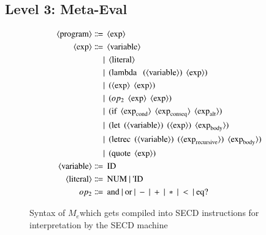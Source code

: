\documentclass[a4paper,12pt,twoside,openright]{report}
\theoremstyle{definition}
\newcommand{\ts}{\textquotesingle}
\newcommand{\mevl}{$M_{e}$}
\begin{document}
\subsection{Level 3: Meta-Eval}\label{subsec:mevl}
\begin{figure}[ht!]
\begin{align*}
	\langle \text{program} \rangle \Coloneqq & \:\: \langle \text{exp} \rangle \\
	\langle \text{exp} \rangle \Coloneqq & \:\: \langle \text{variable} \rangle \\
															   & | \:\: \langle \text{literal} \rangle \\
															   & | \:\: \text{(lambda \: (} \langle \text{variable} \rangle\text{)} \:\: \langle \text{exp} \rangle\text{)} \\
															   & | \:\: \text{(} \langle \text{exp} \rangle \:\: \langle \text{exp} \rangle \text{)} \\
															   & | \:\: \text{(} op_{2} \:\: \langle \text{exp} \rangle \:\: \langle \text{exp} \rangle \text{)} \\
															   & | \:\: \text{(if} \:\: \langle \text{exp}_\text{cond} \rangle \:\: \langle \text{exp}_\text{conseq} \rangle \:\: \langle \text{exp}_\text{alt} \rangle \text{)} \\
															   & | \:\: \text{(let} \:\: \text{(} \langle \text{variable} \rangle \text{)} \:\: \text{(}\langle \text{exp} \rangle \text{)} \:\: \langle \text{exp}_\text{body} \rangle \text{)} \\
															   & | \:\: \text{(letrec} \:\: \text{(} \langle \text{variable} \rangle \text{)} \:\: \text{(}\langle \text{exp}_\text{recursive} \rangle \text{)} \:\: \langle \text{exp}_\text{body} \rangle \text{)} \\
															   & | \:\: \text{(quote} \:\: \langle \text{exp} \rangle \text{)} \\
	\langle \text{variable} \rangle \Coloneqq & \:\: \text{ID} \\
	\langle \text{literal} \rangle \Coloneqq & \:\: \text{NUM} \: | \: \text{{\ts}ID} \\
	op_{2} \Coloneqq & \:\: \text{and} \: | \: \text{or} \: | \: - \: | \: + \: | \: * \: | \: < \: | \: \text{eq?}
\end{align*}
\caption{Syntax of \mevl which gets compiled into SECD instructions for interpretation by the SECD machine}
\label{fig:mevl_syntax}
\end{figure}
\end{document}

